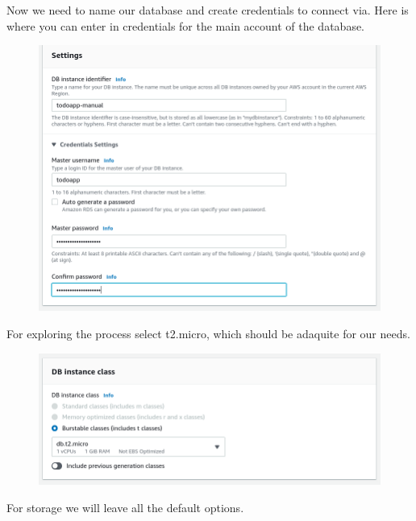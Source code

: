 \documentclass{csse4400}
\begin{document}
Now we need to name our database and create credentials to connect via. Here is where you can enter in credentials for the main account of the database.

\begin{figure}[H]
  \includegraphics[width=\textwidth]{images/db3}
\end{figure}

For exploring the process select t2.micro, which should be adaquite for our needs.


\begin{figure}[H]
  \includegraphics[width=\textwidth]{images/db4}
\end{figure}

For storage we will leave all the default options.
\end{document}
